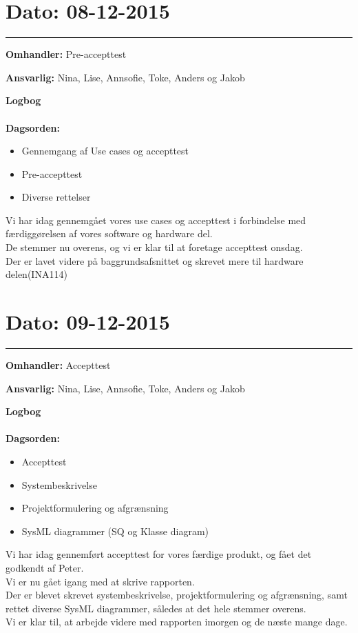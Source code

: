 	
	
\section{Dato: 08-12-2015 }
\hrule

\textbf{Omhandler:} Pre-accepttest

\textbf{Ansvarlig:} Nina, Lise, Annsofie, Toke, Anders og Jakob

\textbf{Logbog}
\\
\\
\textbf{Dagsorden:}
\begin{itemize}
	\item Gennemgang af Use cases og accepttest
	\item Pre-accepttest 
	\item Diverse rettelser
\end{itemize}

Vi har idag gennemgået vores use cases og accepttest i forbindelse med færdiggørelsen af vores software og hardware del. \\
De stemmer nu overens, og vi er klar til at foretage accepttest onsdag.\\
Der er lavet videre på baggrundsafsnittet og skrevet mere til hardware delen(INA114)

	
	
	
\section{Dato: 09-12-2015 }
\hrule

\textbf{Omhandler:} Accepttest

\textbf{Ansvarlig:} Nina, Lise, Annsofie, Toke, Anders og Jakob

\textbf{Logbog}
\\
\\
\textbf{Dagsorden:}
\begin{itemize}
	\item Accepttest
	\item Systembeskrivelse
	\item Projektformulering og afgrænsning
	\item SysML diagrammer (SQ og Klasse diagram)
\end{itemize}

Vi har idag gennemført accepttest for vores færdige produkt, og fået det godkendt af Peter. \\
Vi er nu gået igang med at skrive rapporten.\\
Der er blevet skrevet systembeskrivelse, projektformulering og afgrænsning, samt rettet diverse SysML diagrammer, således at det hele stemmer overens. \\
Vi er klar til, at arbejde videre med rapporten imorgen og de næste mange dage. 


